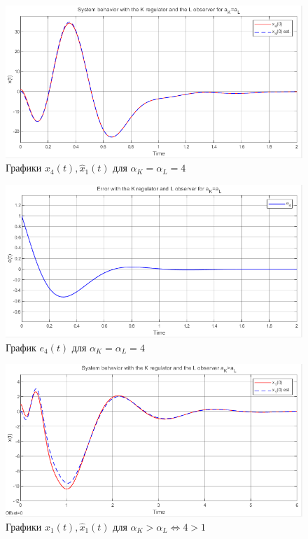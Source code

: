 \documentclass[a4paper, 12pt]{article}
\begin{document}
    \newpage
    \vspace*{20mm}
    \begin{figure}[H]
        \centering
        \includegraphics[scale=0.8]{2task_aK=aL_x4.png}
        \captionsetup{skip=0pt}
        \caption{Графики $x_4(t),\hat{x}_1(t)$ для $\alpha_K=\alpha_L=4$}
        \label{2task_aKeqaL_x4}
    \end{figure}
    \begin{figure}[H]
        \centering
        \includegraphics[scale=0.8]{2task_aK=aL_e4.png}
        \captionsetup{skip=0pt}
        \caption{График $e_4(t)$ для $\alpha_K=\alpha_L=4$}
        \label{2task_aKeqaL_e4}
    \end{figure}
    \newpage
    \vspace*{20mm}
    \begin{figure}[H]
        \centering
        \includegraphics[scale=0.8]{2task_aKgaL_x1.png}
        \captionsetup{skip=0pt}
        \caption{Графики $x_1(t),\hat{x}_1(t)$ для $\alpha_K>\alpha_L\Leftrightarrow4>1$}
        \label{2task_aKgaL_x1}
    \end{figure}
\end{document}
